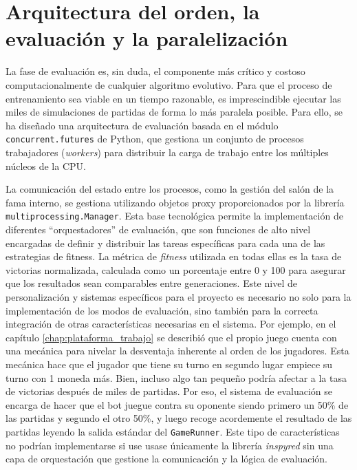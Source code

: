 \section{Arquitectura del orden, la evaluación y la paralelización} \label{sec:paralelizacion_algoritmo}

La fase de evaluación es, sin duda, el componente más crítico y costoso computacionalmente de cualquier algoritmo evolutivo. Para que el proceso de entrenamiento sea viable en un tiempo razonable, es imprescindible ejecutar las miles de simulaciones de partidas de forma lo más paralela posible. Para ello, se ha diseñado una arquitectura de evaluación basada en el módulo \texttt{concurrent.futures} de Python, que gestiona un conjunto de procesos trabajadores (\textit{workers}) para distribuir la carga de trabajo entre los múltiples núcleos de la CPU.

La comunicación del estado entre los procesos, como la gestión del salón de la fama interno, se gestiona utilizando objetos proxy proporcionados por la librería \texttt{multiprocessing.Manager}. Esta base tecnológica permite la implementación de diferentes ``orquestadores'' de evaluación, que son funciones de alto nivel encargadas de definir y distribuir las tareas específicas para cada una de las estrategias de fitness. La métrica de \textit{fitness} utilizada en todas ellas es la tasa de victorias normalizada, calculada como un porcentaje entre 0 y 100 para asegurar que los resultados sean comparables entre generaciones. Este nivel de personalización y sistemas específicos para el proyecto es necesario no solo para la implementación de los modos de evaluación, sino también para la correcta integración de otras características necesarias en el sistema. Por ejemplo, en el capítulo \ref{chap:plataforma_trabajo} se describió que el propio juego cuenta con una mecánica para nivelar la desventaja inherente al orden de los jugadores. Esta mecánica hace que el jugador que tiene su turno en segundo lugar empiece su turno con 1 moneda más. Bien, incluso algo tan pequeño podría afectar a la tasa de victorias después de miles de partidas. Por eso, el sistema de evaluación se encarga de hacer que el bot juegue contra su oponente siendo primero un 50\% de las partidas y segundo el otro 50\%, y luego recoge acordemente el resultado de las partidas leyendo la salida estándar del \texttt{GameRunner}. Este tipo de características no podrían implementarse si use usase únicamente la librería \textit{inspyred} sin una capa de orquestación que gestione la comunicación y la lógica de evaluación.

